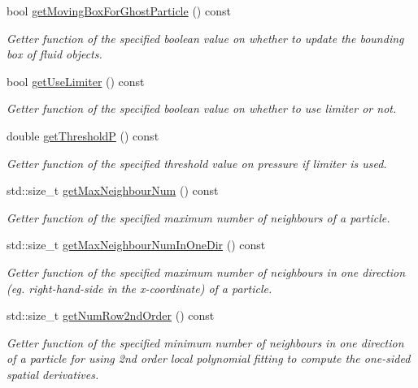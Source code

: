 \begin{DoxyCompactItemize}
bool \hyperlink{classInitializer_abf444acdb91394def021a2f74ab5243f}{get\-Moving\-Box\-For\-Ghost\-Particle} () const 
\begin{DoxyCompactList}\small\item\em Getter function of the specified boolean value on whether to update the bounding box of fluid objects. \end{DoxyCompactList}\item 
bool \hyperlink{classInitializer_a0bc9d30df11bc117f92745faba61d35d}{get\-Use\-Limiter} () const 
\begin{DoxyCompactList}\small\item\em Getter function of the specified boolean value on whether to use limiter or not. \end{DoxyCompactList}\item 
double \hyperlink{classInitializer_a77fcb334d6948a0e6db3925227dc2dad}{get\-Threshold\-P} () const 
\begin{DoxyCompactList}\small\item\em Getter function of the specified threshold value on pressure if limiter is used. \end{DoxyCompactList}\item 
std\-::size\-\_\-t \hyperlink{classInitializer_a32b46cefcbeccae88af7a46bed5949ee}{get\-Max\-Neighbour\-Num} () const 
\begin{DoxyCompactList}\small\item\em Getter function of the specified maximum number of neighbours of a particle. \end{DoxyCompactList}\item 
std\-::size\-\_\-t \hyperlink{classInitializer_a67b441e77ae377f8f418d6c28afd8df1}{get\-Max\-Neighbour\-Num\-In\-One\-Dir} () const 
\begin{DoxyCompactList}\small\item\em Getter function of the specified maximum number of neighbours in one direction (eg. right-\/hand-\/side in the x-\/coordinate) of a particle. \end{DoxyCompactList}\item 
std\-::size\-\_\-t \hyperlink{classInitializer_a2e286f2e4362dea53eda3c20ab5f7ede}{get\-Num\-Row2nd\-Order} () const 
\begin{DoxyCompactList}\small\item\em Getter function of the specified minimum number of neighbours in one direction of a particle for using 2nd order local polynomial fitting to compute the one-\/sided spatial derivatives. \end{DoxyCompactList}\item 

\end{DoxyCompactItemize}

